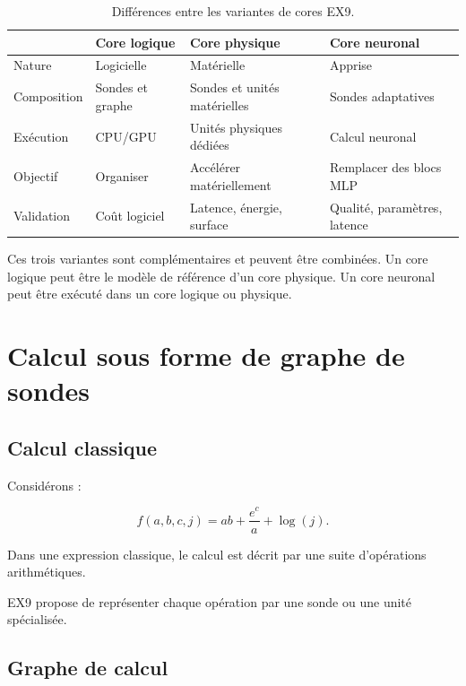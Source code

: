 \documentclass[11pt,a4paper]{article}
\begin{document}
\begin{table}[H]
\centering
\small
\begin{tabularx}{\textwidth}{p{2.5cm}XXX}
\toprule
 & Core logique & Core physique & Core neuronal \\
\midrule
Nature
& Logicielle
& Matérielle
& Apprise \\

Composition
& Sondes et graphe
& Sondes et unités matérielles
& Sondes adaptatives \\

Exécution
& CPU/GPU
& Unités physiques dédiées
& Calcul neuronal \\

Objectif
& Organiser
& Accélérer matériellement
& Remplacer des blocs MLP \\

Validation
& Coût logiciel
& Latence, énergie, surface
& Qualité, paramètres, latence \\
\bottomrule
\end{tabularx}
\caption{Différences entre les variantes de cores EX9.}
\end{table}

Ces trois variantes sont complémentaires et peuvent être combinées.
Un core logique peut être le modèle de référence d'un core physique.
Un core neuronal peut être exécuté dans un core logique ou physique.

\section{Calcul sous forme de graphe de sondes}

\subsection{Calcul classique}

Considérons :

\[
f(a,b,c,j)
=
ab+\frac{e^c}{a}+\log(j).
\]

Dans une expression classique, le calcul est décrit par une suite
d'opérations arithmétiques.

EX9 propose de représenter chaque opération par une sonde ou une
unité spécialisée.

\subsection{Graphe de calcul}
\end{document}
